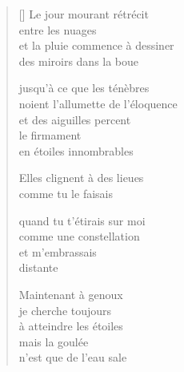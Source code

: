 \documentclass[12pt,a4paper]{article}
\begin{document}
\begin{verse}[\versewidth]
  Le jour mourant rétrécit \\
  entre les nuages \\
  et la pluie commence à dessiner \\
  des miroirs dans la boue

  jusqu'à ce que les ténèbres \\
  noient l'allumette de l'éloquence \\
  et des aiguilles percent \\
  le firmament \\
  en étoiles innombrables

  Elles clignent à des lieues \\
  comme tu le faisais

  quand tu t'étirais sur moi \\
  comme une constellation \\
  et m'embrassais \\
  distante

  Maintenant à genoux \\
  je cherche toujours \\
  à atteindre les étoiles \\
  mais la goulée \\
  n'est que de l'eau sale
\end{verse}


\newpage

\poemtitle{}

\settowidth{\versewidth}{qui sondent silencieusement ta nuit}

\bigskip
\end{document}
